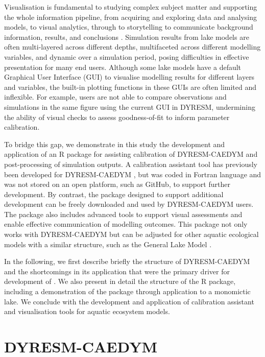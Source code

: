 Visualisation is fundamental to studying complex subject matter and supporting the whole information pipeline, from acquiring and exploring data and analysing models, to visual analytics, through to storytelling to communicate background information, results, and conclusions \citep{mcinerny2014information}. Simulation results from lake models are often multi-layered across different depths, multifaceted across different modelling variables, and dynamic over a simulation period, posing difficulties in effective presentation for many end users. Although some lake models have a default Graphical User Interface (GUI) to visualise modelling results for different layers and variables, the built-in plotting functions in these GUIs are often limited and inflexible. For example, users are not able to compare observations and simulations in the same figure using the current GUI in DYRESM, undermining the ability of visual checks to assess goodness-of-fit to inform parameter calibration.\par

To bridge this gap, we demonstrate in this study the development and application of an R package  for assisting calibration of DYRESM-CAEDYM and post-processing of simulation outputs. A calibration assistant tool has previously been developed for DYRESM-CAEDYM \citep{luo2018autocalibration}, but was coded in Fortran language and was not stored on an open platform, such as GitHub, to support further development. By contrast, the  package designed to support additional development can be freely downloaded and used by DYRESM-CAEDYM users. The package also includes advanced tools to support visual assessments and enable effective communication of modelling outcomes. This package not only works with DYRESM-CAEDYM but can be adjusted for other aquatic ecological models with a similar structure, such as the General Lake Model \citep{hipsey2019general}.\par

In the following, we first describe briefly the structure of DYRESM-CAEDYM and the shortcomings in its application that were the primary driver for development of . We also present in detail the structure of the R package, including a demonstration of the package through application to a monomictic lake. We conclude with the development and application of calibration assistant and visualisation tools for aquatic ecosystem models.\par

\section{DYRESM-CAEDYM}


